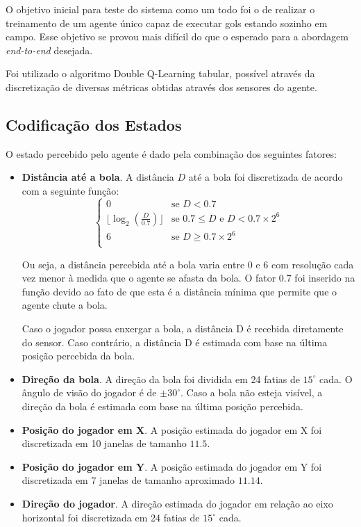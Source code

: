 O objetivo inicial para teste do sistema como um todo foi o de realizar o treinamento de um agente único capaz de executar gols estando sozinho em campo. Esse objetivo se provou mais difícil do que o esperado para a abordagem \textit{end-to-end} desejada.

Foi utilizado o algoritmo Double Q-Learning tabular, possível através da discretização de diversas métricas obtidas através dos sensores do agente.

\subsection{Codificação dos Estados}

O estado percebido pelo agente é dado pela combinação dos seguintes fatores:

\begin{itemize}
    \item \textbf{Distância até a bola}. A distância $D$ até a bola foi discretizada de acordo com a seguinte função:
    \begin{equation}
    \label{eq:balldist}
    \left\{
        \begin{array}{ll}
            0  & \mbox{se } D < 0.7 \\
            \lfloor\log_2 (\frac{D}{0.7})\rfloor & \mbox{se } 0.7 \leq D \mbox{ e } D < 0.7 \times 2^6 \\
            6  & \mbox{se } D \geq 0.7 \times 2^6 \\

        \end{array}
    \right.
    \end{equation}

    Ou seja, a distância percebida até a bola varia entre 0 e 6 com resolução cada vez menor à medida que o agente se afasta da bola. O fator 0.7 foi inserido na função devido ao fato de que esta é a distância mínima que permite que o agente chute a bola.

    Caso o jogador possa enxergar a bola, a distância D é recebida diretamente do sensor. Caso contrário, a distância D é estimada com base na última posição percebida da bola.

    \item \textbf{Direção da bola}. A direção da bola foi dividida em 24 fatias de $15^{\circ}$ cada. O ângulo de visão do jogador é de $\pm30^{\circ}$. Caso a bola não esteja visível, a direção da bola é estimada com base na última posição percebida.
    
    \item \textbf{Posição do jogador em X}. A posição estimada do jogador em X foi discretizada em 10 janelas de tamanho $11.5$.

    \item \textbf{Posição do jogador em Y}. A posição estimada do jogador em Y foi discretizada em 7 janelas de tamanho aproximado $11.14$.
    
    \item \textbf{Direção do jogador}. A direção estimada do jogador em relação ao eixo horizontal foi discretizada em 24 fatias de $15^{\circ}$ cada.

\end{itemize}

